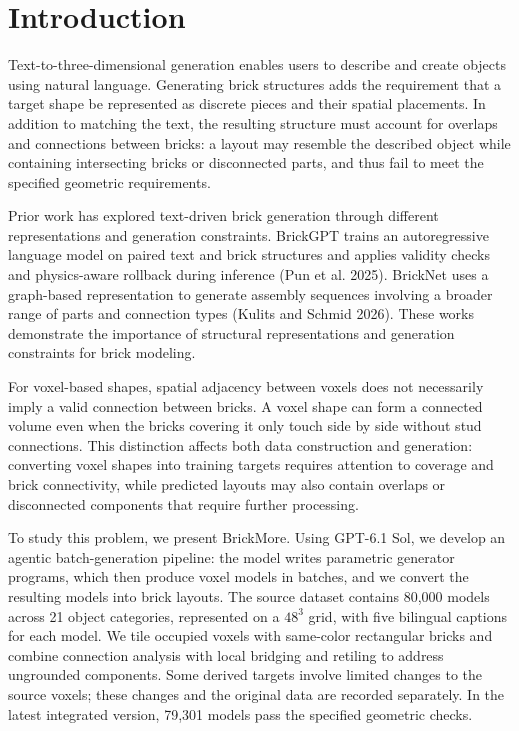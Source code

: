 \documentclass[10pt,twocolumn,letterpaper]{article}
\begin{document}
\section{Introduction}
Text-to-three-dimensional generation enables users to describe and create objects using natural language. Generating brick structures adds the requirement that a target shape be represented as discrete pieces and their spatial placements. In addition to matching the text, the resulting structure must account for overlaps and connections between bricks: a layout may resemble the described object while containing intersecting bricks or disconnected parts, and thus fail to meet the specified geometric requirements.

Prior work has explored text-driven brick generation through different representations and generation constraints. BrickGPT trains an autoregressive language model on paired text and brick structures and applies validity checks and physics-aware rollback during inference (Pun et al. 2025). BrickNet uses a graph-based representation to generate assembly sequences involving a broader range of parts and connection types (Kulits and Schmid 2026). These works demonstrate the importance of structural representations and generation constraints for brick modeling.

For voxel-based shapes, spatial adjacency between voxels does not necessarily imply a valid connection between bricks. A voxel shape can form a connected volume even when the bricks covering it only touch side by side without stud connections. This distinction affects both data construction and generation: converting voxel shapes into training targets requires attention to coverage and brick connectivity, while predicted layouts may also contain overlaps or disconnected components that require further processing.

To study this problem, we present BrickMore. Using GPT-6.1 Sol, we develop an agentic batch-generation pipeline: the model writes parametric generator programs, which then produce voxel models in batches, and we convert the resulting models into brick layouts. The source dataset contains 80,000 models across 21 object categories, represented on a $48^3$ grid, with five bilingual captions for each model. We tile occupied voxels with same-color rectangular bricks and combine connection analysis with local bridging and retiling to address ungrounded components. Some derived targets involve limited changes to the source voxels; these changes and the original data are recorded separately. In the latest integrated version, 79,301 models pass the specified geometric checks.
\end{document}
